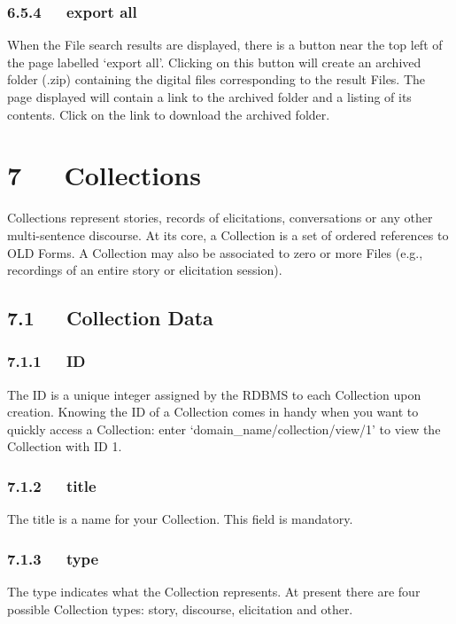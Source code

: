 \documentclass[letterpaper,10pt,english]{sphinxmanual}
\begin{document}
\subsection{6.5.4   export all}
\label{documentation:id10}
When the File search results are displayed, there is a button near the top left
of the page labelled `export all'.  Clicking on this button will create an
archived folder (.zip) containing the digital files corresponding to the result
Files.  The page displayed will contain a link to the archived folder and a
listing of its contents.  Click on the link to download the archived folder.


\chapter{7   Collections}
\label{documentation:collections}
Collections represent stories, records of elicitations, conversations or any
other multi-sentence discourse.  At its core, a Collection is a set of ordered
references to OLD Forms.  A Collection may also be associated to zero or more
Files (e.g., recordings of an entire story or elicitation session).


\section{7.1   Collection Data}
\label{documentation:collection-data}

\subsection{7.1.1   ID}
\label{documentation:id11}
The ID is a unique integer assigned by the RDBMS to each Collection upon
creation.  Knowing the ID of a Collection comes in handy when you want to
quickly access a Collection: enter `domain\_name/collection/view/1' to view the
Collection with ID 1.


\subsection{7.1.2   title}
\label{documentation:title}
The title is a name for your Collection.  This field is mandatory.


\subsection{7.1.3   type}
\label{documentation:type}
The type indicates what the Collection represents.  At present there are four
possible Collection types: story, discourse, elicitation and other.
\end{document}
